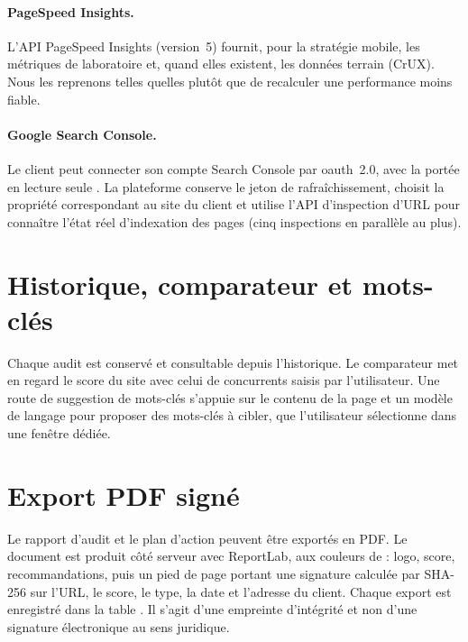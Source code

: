 \paragraph{PageSpeed Insights.} L'API PageSpeed Insights (version~5) fournit, pour la stratégie mobile, les métriques de laboratoire et, quand elles existent, les données terrain (CrUX). Nous les reprenons telles quelles plutôt que de recalculer une performance moins fiable.

\paragraph{Google Search Console.} Le client peut connecter son compte Search Console par \gls{oauth}~2.0, avec la portée en lecture seule . La plateforme conserve le jeton de rafraîchissement, choisit la propriété correspondant au site du client et utilise l'API d'inspection d'URL pour connaître l'état réel d'indexation des pages (cinq inspections en parallèle au plus). 

\section{Historique, comparateur et mots-clés}
Chaque audit est conservé et consultable depuis l'historique. Le comparateur met en regard le score du site avec celui de concurrents saisis par l'utilisateur. Une route de suggestion de mots-clés s'appuie sur le contenu de la page et un modèle de langage pour proposer des mots-clés à cibler, que l'utilisateur sélectionne dans une fenêtre dédiée. 


\section{Export PDF signé}
Le rapport d'audit et le plan d'action peuvent être exportés en PDF. Le document est produit côté serveur avec ReportLab, aux couleurs de \xapp{} : logo, score, recommandations, puis un pied de page portant une signature calculée par SHA-256 sur l'URL, le score, le type, la date et l'adresse du client. Chaque export est enregistré dans la table . Il s'agit d'une empreinte d'intégrité et non d'une signature électronique au sens juridique. 

